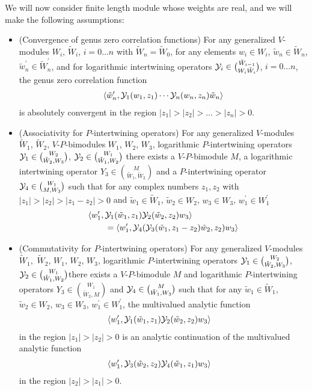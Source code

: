 \documentclass[12pt]{article}
\begin{document}
We will now consider finite length module whose weights are real,
and we will make the following assumptions:
\begin{itemize}
  \item (Convergence of genus zero correlation functions) For any generalized
    $V$-modules $W_i$, $\tilde W_i$, $i=0\ldots n$ with $\tilde W_n = \tilde W_0$,
    for any elements $w_i\in W_i$, $\tilde w_n \in \tilde W_n$,
    $\tilde w_n^\prime \in \tilde W_n^\prime$, and for logarithmic intertwining
    operators $\mathcal{Y}_i\in \binom{\tilde W_{i-1}}{W_i \tilde W_i}$, $i=0\ldots n$,
    the genus zero correlation function
    \begin{align*}
      \langle\tilde w_n^\prime, \mathcal{Y}_1(w_1,z_1)\cdots\mathcal{Y}_n(w_n,z_n)\tilde w_n\rangle
    \end{align*}
    is absolutely convergent in the region $|z_1|>|z_2|>\ldots>|z_n|>0$.
  \item (Associativity for $P$-intertwining operators)
    For any generalized $V$-modules $\tilde W_1$, $\tilde W_2$,
    $V$-$P$-bimodules $W_1$, $W_2$, $W_3$, logarithmic
    $P$-intertwining operators $\mathcal{Y}_1\in \binom{W_2}{\tilde W_2, W_3}$,
    $\mathcal{Y}_2\in \binom{W_1}{\tilde W_1, W_2}$ there exists
    a $V$-$P$-bimodule $M$, a logarithmic intertwining operator
    $Y_3\in \binom{M}{\tilde W_1, \tilde W_2}$ and a $P$-intertwining operator
    $\mathcal{Y}_4 \in \binom{W_1}{M, W_3}$ such that for any complex numbers
    $z_1, z_2$ with $|z_1|>|z_2|>|z_1-z_2|>0$ and $\tilde w_1 \in \tilde W_1$,
    $\tilde w_2 \in W_2$, $w_3 \in W_3$, $w_1^\prime \in W_1^\prime$ 
    \begin{align*}
      &\langle w_1^\prime, \mathcal{Y}_1(\tilde w_1, z_1)\mathcal{Y}_2(\tilde w_2, z_2)w_3\rangle\\
      &\qquad = \langle w_1^\prime, 
        \mathcal{Y}_4(\mathcal{Y}_3(\tilde w_1, z_1-z_2)\tilde w_2, z_2)w_3\rangle
    \end{align*}
  \item (Commutativity for $P$-intertwining operators) 
    For any generalized $V$-modules $\tilde W_1,$ $\tilde W_2$, $W_1$, $W_2$,
    $W_3$, logarithmic $P$-intertwining operators $\mathcal{Y}_1\in \binom{W_2}{\tilde W_2, W_3}$,
    $\mathcal{Y}_2\in \binom{W_1}{\tilde W_1, W_2}$there exists
    a $V$-$P$-bimodule $M$ and logarithmic $P$-intertwining operators
    $Y_3\in \binom{W_1}{\tilde W_2, M}$
    and $\mathcal{Y}_4 \in \binom{M}{\tilde W_1, W_3}$ such that for any
    $\tilde w_1 \in \tilde W_1$,
    $\tilde w_2 \in W_2$, $w_3 \in W_3$, $w_1^\prime \in W_1^\prime$,
    the multivalued analytic function 
    \begin{align*}
      &\langle w_1^\prime, \mathcal{Y}_1(\tilde w_1, z_1)\mathcal{Y}_2(\tilde w_2, z_2)w_3\rangle
    \end{align*}
    in the region $|z_1|>|z_2|>0$ is an analytic continuation of the multivalued
    analytic function
    \begin{align*}
      &\langle w_1^\prime, \mathcal{Y}_3(\tilde w_2, z_2)\mathcal{Y}_4(\tilde w_1, z_1)w_3\rangle
    \end{align*}
    in the region $|z_2|>|z_1|>0$.
\end{itemize}
\end{document}
